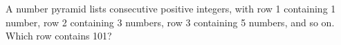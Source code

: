 A number pyramid lists consecutive positive integers, with row 1 containing 1 number, row 2 containing 3 numbers, row 3 containing 5 numbers, and so on. Which row contains 101?
